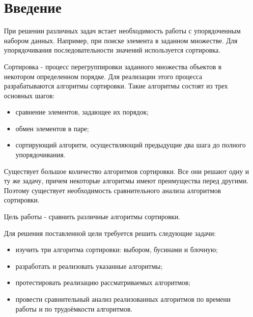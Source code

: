 \chapter*{Введение}

При решении различных задач встает необходимость работы с упорядоченным набором данных. 
Например, при поиске элемента в заданном множестве. 
Для упорядочивания последовательности значений используется сортировка.

Сортировка - процесс перегруппировки заданного множества объектов в некотором определенном порядке. 
Для реализации этого процесса разрабатываются алгоритмы сортировки. 
Такие алгоритмы состоят из трех основных шагов: 

\begin{itemize}
	\item сравнение элементов, задающее их порядок;
	\item обмен элементов в паре;
	\item сортирующий алгоритм, осуществляющий предыдущие два шага до полного упорядочивания.
\end{itemize}


Существует большое количество алгоритмов сортировки. 
Все они решают одну и ту же задачу, причем некоторые алгоритмы имеют преимущества перед другими.
Поэтому существует необходимость сравнительного анализа алгоритмов сортировки. 

Цель работы - сравнить различные алгоритмы сортировки.

Для решения поставленной цели требуется решить следующие задачи:

\begin{itemize}
	\item изучить три алгоритма сортировки: выбором, бусинами и блочную;
	\item разработать и реализовать указанные алгоритмы;
	\item протестировать реализацию рассматриваемых алгоритмов;
	\item провести сравнительный анализ реализованных алгоритмов по времени работы и по трудоёмкости алгоритмов.
\end{itemize}